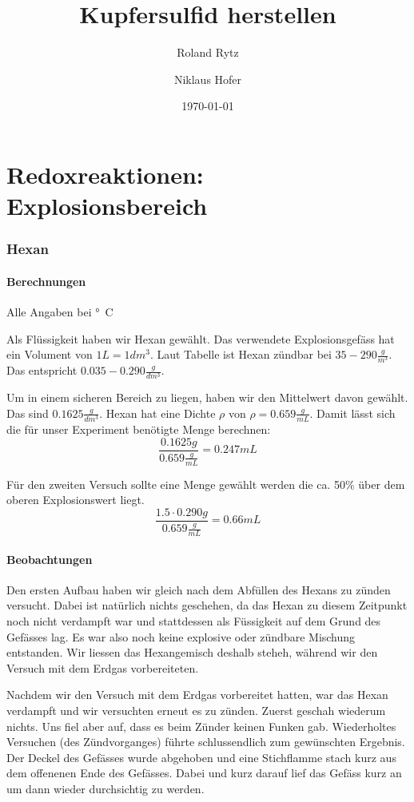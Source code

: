 \documentclass[11pt,paper=a4,final]{scrartcl}
\title{Kupfersulfid herstellen}
\author{Roland Rytz \and Niklaus Hofer}
\date{\today{}}
\begin{document}
\maketitle
\newpage
\tableofcontents
\part{Redoxreaktionen: Explosionsbereich}
\section{Hexan}
\subsection{Berechnungen}
Alle Angaben bei \unit[20]{°C}

Als Fl\"ussigkeit haben wir Hexan gew\"ahlt. Das verwendete Explosionsgef\"ass
hat ein Volument von \(1L = 1dm^3\). Laut Tabelle ist Hexan z\"undbar
bei \(35-290 \frac{g}{m^3}\). Das entspricht \(0.035 - 0.290 \frac{g}{dm^3}\).

Um in einem sicheren Bereich zu liegen, haben wir den Mittelwert davon
gew\"ahlt. Das sind \(0.1625 \frac{g}{dm^3}\).
Hexan hat eine Dichte \(\rho\) von \(\rho = 0.659 \frac{g}{mL}\). Damit l\"asst
sich die f\"ur unser Experiment ben\"otigte Menge berechnen:
\[ \frac{0.1625g}{0.659\frac{g}{mL}} = 0.247mL \]

F\"ur den zweiten Versuch sollte eine Menge gew\"ahlt werden die ca. 50\% \"uber
dem oberen Explosionswert liegt. 
\[ \frac{1.5 \cdot 0.290g}{0.659\frac{g}{mL}} = 0.66mL \]

\subsection{Beobachtungen}
Den ersten Aufbau haben wir gleich nach dem Abf\"ullen des Hexans zu z\"unden
versucht. Dabei ist nat\"urlich nichts geschehen, da das Hexan zu diesem
Zeitpunkt noch nicht verdampft war und stattdessen als F\"ussigkeit auf dem
Grund des Gef\"asses lag. Es war also noch keine explosive oder z\"undbare
Mischung entstanden. Wir liessen das Hexangemisch deshalb steheh, w\"ahrend wir
den Versuch mit dem Erdgas vorbereiteten.

Nachdem wir den Versuch mit dem Erdgas vorbereitet hatten, war das Hexan
verdampft und wir versuchten erneut es zu z\"unden. Zuerst geschah wiederum
nichts. Uns fiel aber auf, dass es beim Z\"under keinen Funken gab. Wiederholtes
Versuchen (des Z\"undvorganges) f\"uhrte schlussendlich zum gew\"unschten
Ergebnis. Der Deckel des Gef\"asses wurde abgehoben und eine Stichflamme stach
kurz aus dem offenenen Ende des Gef\"asses. Dabei und kurz darauf lief das
Gef\"ass kurz an um dann wieder durchsichtig zu werden.
\end{document}
